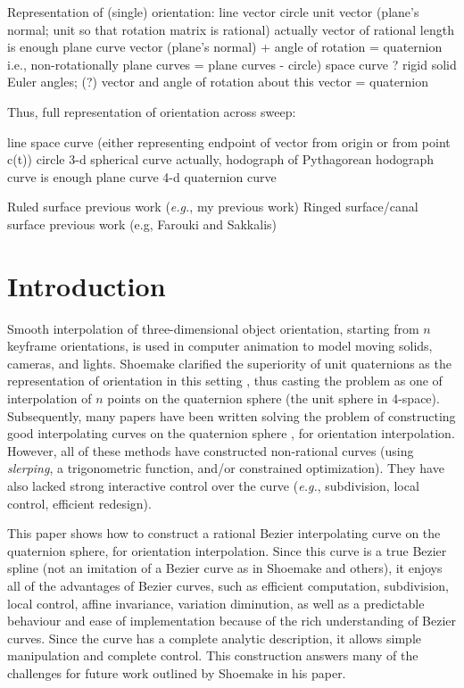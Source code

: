 {Representation of (single) orientation:
	line		vector
	circle		unit vector (plane's normal; 
				     unit so that rotation matrix is rational)
			actually vector of rational length is enough
	plane curve	vector (plane's normal) + angle of rotation = quaternion
				     i.e., non-rotationally plane curves = plane curves - circle)
	space curve	?
	rigid solid	Euler angles; (?) vector and angle of rotation about this vector = quaternion

Thus, full representation of orientation across sweep:

	line		space curve (either representing endpoint of vector from
				origin or from point c(t))
	circle		3-d spherical curve
			actually, hodograph of Pythagorean hodograph curve is enough
	plane curve	4-d quaternion curve


Ruled surface previous work ({\em e.g.}, my previous work)
Ringed surface/canal surface previous work (e.g, Farouki and Sakkalis)
}

\section{Introduction}

Smooth interpolation of three-dimensional object orientation,
starting from $n$ keyframe orientations, is used in computer animation
to model moving solids, cameras, and lights.
Shoemake clarified the superiority of unit quaternions as the
representation of orientation in this setting \cite{shoemake85},
thus casting the problem as one of interpolation of $n$ points on
the quaternion sphere (the unit sphere in 4-space).
Subsequently, many papers have been written solving the problem of
constructing good interpolating curves on the quaternion sphere
\cite{shoemake85,duff85,gabriel85,pletinckx89,schlag91,barr92},
for orientation interpolation.
However, all of these methods have constructed non-rational curves
(using {\em slerping}, a trigonometric function, and/or
constrained optimization).
They have also lacked strong interactive control over the curve
({\em e.g.}, subdivision, local control, efficient redesign).

This paper shows how to construct
a rational Bezier interpolating curve on the
quaternion sphere, for orientation interpolation.
Since this curve is a true Bezier spline (not an imitation of a Bezier
curve as in Shoemake and others),
it enjoys all of the advantages of Bezier curves, such as efficient
computation, subdivision, local control, affine invariance, 
variation diminution, as well as a predictable behaviour and ease of 
implementation because of the rich understanding of Bezier curves.
Since the curve has a complete analytic description, it allows
simple manipulation and complete control.
This construction answers many of the challenges for future work
outlined by Shoemake in his paper.

